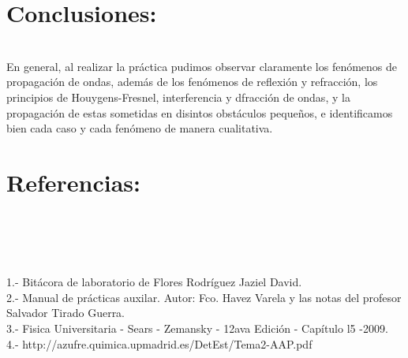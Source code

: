 \documentclass[10pt,a4paper]{article}
\begin{document}
\section*{Conclusiones:}\\
En general, al realizar la pr\'{a}ctica pudimos observar claramente los fen\'{o}menos de propagaci\'{o}n de ondas, adem\'{a}s de los fen\'{o}menos de reflexi\'{o}n y refracci\'{o}n, los principios de Houygens-Fresnel, interferencia y dfracci\'{o}n de ondas, y la propagaci\'{o}n de estas sometidas en disintos obst\'{a}culos peque\~{n}os, e identificamos bien cada caso y cada fen\'{o}meno de manera cualitativa. 

\section*{Referencias:}\\
\\
\medskip
\\
\\1.- Bit\'{a}cora de laboratorio de Flores Rodr\'{i}guez Jaziel David.
\\
2.- Manual de pr\'{a}cticas auxilar. Autor: Fco. Havez Varela y las notas del profesor Salvador Tirado Guerra.
\\
3.- Fisica Universitaria - Sears - Zemansky - 12ava Edici\'{o}n - Cap\'{i}tulo l5 -2009.\\
4.- http://azufre.quimica.upmadrid.es/DetEst/Tema2-AAP.pdf\\
\end{document}
